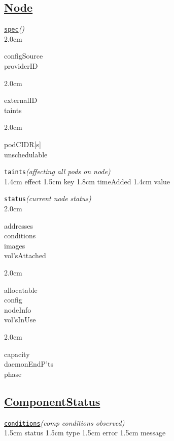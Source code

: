 \subsection*{\href{https://kubernetes.io/docs/concepts/architecture/nodes/}{Node}}

\texttt{\href{https://kubernetes.io/docs/reference/kubernetes-api/cluster-resources/node-v1/}{spec}}\quad\textit{()}\\[-2mm]
\api
{2.0cm}{
configSource        \\
providerID

}
{2.0cm}{
externalID          \\
taints

}
{2.0cm}{
podCIDR[s]          \\
unschedulable

}
\stopapi

\texttt{taints}\quad\textit{(affecting all pods on node)}\\[-2mm]
\api
{1.4cm}{
effect
}
{1.5cm}{
key
}
{1.8cm}{
timeAdded
}
{1.4cm}{
value
}
\stopapi


\texttt{status}\quad\textit{(current node status)}\\[-2mm]
\api
{2.0cm}{
addresses       \\
conditions      \\
images          \\
vol'sAttached

}
{2.0cm}{
allocatable     \\
config          \\
nodeInfo        \\
vol'sInUse

}
{2.0cm}{
capacity        \\
daemonEndP'ts   \\
phase           


}
\stopapi



\subsection*{\href{https://kubernetes.io/docs/concepts/overview/components/}{ComponentStatus}}


\texttt{\href{https://kubernetes.io/docs/reference/kubernetes-api/cluster-resources/component-status-v1/}{conditions}}\quad\textit{(comp conditions observed)}\\[-2mm]
\api
{1.5cm}{
status
}
{1.5cm}{
type
}
{1.5cm}{
error
}
{1.5cm}{
message
}
\stopapi



